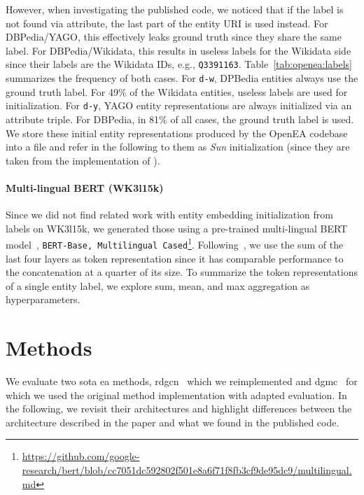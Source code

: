 \documentclass[runningheads]{llncs}
\begin{document}
However, when investigating the published code, we noticed that if the label is not found via attribute, the last part of the entity URI is used instead.
For DBPedia/YAGO, this effectively leaks ground truth since they share the same label.
For DBPedia/Wikidata, this results in useless labels for the Wikidata side since their labels are the Wikidata IDs, e.g., \texttt{Q3391163}.
Table~\ref{tab:openea:labels} summarizes the frequency of both cases.
For \texttt{d-w}, DPBedia entities always use the ground truth label. 
For 49\% of the Wikidata entities, useless labels are used for initialization.
For \texttt{d-y}, YAGO entity representations are always initialized via an attribute triple.
For DBPedia, in 81\% of all cases, the ground truth label is used.
We store these initial entity representations produced by the OpenEA codebase into a file and refer in the following to them as \emph{Sun} initialization (since they are taken from the implementation of \cite{DBLP:journals/pvldb/SunZHWCAL20}).


\paragraph{Multi-lingual BERT (WK3l15k)}
Since we did not find related work with entity embedding initialization from labels on WK3l15k, we generated those using a pre-trained multi-lingual BERT model~\cite{DBLP:conf/naacl/DevlinCLT19}, \texttt{BERT-Base, Multilingual Cased}\footnote{\url{https://github.com/google-research/bert/blob/cc7051dc592802f501e8a6f71f8fb3cf9de95dc9/multilingual.md}}.
Following~\cite{DBLP:conf/naacl/DevlinCLT19}, we use the sum of the last four layers as token representation since it has comparable performance to the concatenation at a quarter of its size.
To summarize the token representations of a single entity label, we explore sum, mean, and max aggregation as hyperparameters.

\section{Methods}
\label{sec:methods}
We evaluate two \gls{sota} \gls{ea} methods, \acrshort{rdgcn}~\cite{DBLP:conf/ijcai/WuLF0Y019} which we reimplemented and \acrshort{dgmc}~\cite{DBLP:conf/iclr/FeyL0MK20} for which we used the original method implementation with adapted evaluation.
In the following, we revisit their architectures and highlight differences between the architecture described in the paper and what we found in the published code.
\end{document}
